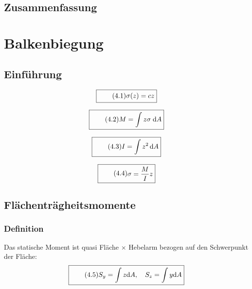 \documentclass[11pt]{article}
\newcommand{\1}{ {\mathds{1}} }
\newcommand{\td}{\,\text{d}}
\begin{document}
		\subsection{Zusammenfassung}

		\section{Balkenbiegung}
		\subsection{Einführung}

		\begin{equation}
			\boxed{
				\tag{4.1}
				\begin{split}
					\sigma(z) = c z
				\end{split}
			}
		\end{equation}

		\begin{equation}
			\boxed{
				\tag{4.2}
				\begin{split}
					M = \int{z\sigma \; \text{d}A}
				\end{split}
			}
		\end{equation}

				\begin{equation}
			\boxed{
				\tag{4.3}
				\begin{split}
					I = \int z^2 \td A
				\end{split}
			}
		\end{equation}

						\begin{equation}
			\boxed{
				\tag{4.4}
				\begin{split}
					\sigma = \frac{M}{I} z
				\end{split}
			}
		\end{equation}

		\subsection{Flächenträgheitsmomente}
		\subsubsection{Definition}

		Das statische Moment ist quasi Fläche $\times$ Hebelarm bezogen auf den Schwerpunkt der Fläche:
		\begin{equation}
			\boxed{
				\tag{4.5}
				\begin{split}
					S_y
					=
					\int z \text{d} A, \quad
					S_z
					=
					\int y \text{d} A
				\end{split}
			}
		\end{equation}
\end{document}

